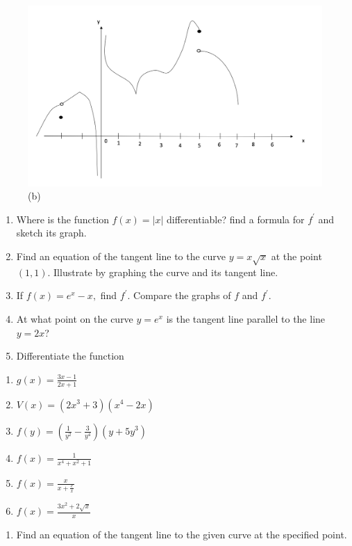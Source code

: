 \documentclass[]{book}
\providecommand{\tightlist}{%
  \setlength{\itemsep}{0pt}\setlength{\parskip}{0pt}}
\begin{document}
\begin{figure}

{\centering \includegraphics[width=0.7\linewidth]{figure/5Derivatives-10} 

}

\caption{(b)}\label{fig:p2}
\end{figure}

\begin{enumerate}
\def\labelenumi{\arabic{enumi}.}
\setcounter{enumi}{3}
\item
  Where is the function \(f(x) = |x|\) differentiable? find a formula for \(f^\prime\) and sketch its graph.
\item
  Find an equation of the tangent line to the curve \(y=x \sqrt x\) at the point \((1,1).\) Illustrate by graphing the curve and its tangent line.
\item
  If \(f(x) = e^x -x,\) find \(f^\prime\). Compare the graphs of \(f\) and \(f^\prime\).
\item
  At what point on the curve \(y=e^x\) is the tangent line parallel to the line \(y=2x\)?
\item
  Differentiate the function
\end{enumerate}

\begin{enumerate}
\def\labelenumi{(\alph{enumi})}
\tightlist
\item
  \(g(x) = \frac{3x-1}{2x+1}\)
\item
  \(V(x) = (2x^3+3)(x^4-2x)\)
\item
  \(f(y) = \left ( \frac{1}{y^2}- \frac{3}{y^4} \right ) (y+5y^3)\)
\item
  \(f(x) = \frac{1}{x^4+x^2+1}\)
\item
  \(f(x) = \frac{x}{x+\frac{c}{x}}\)
\item
  \(f(x) = \frac{3x^2+2\sqrt x}{x}\)
\end{enumerate}

\begin{enumerate}
\def\labelenumi{\arabic{enumi}.}
\setcounter{enumi}{8}
\tightlist
\item
  Find an equation of the tangent line to the given curve at the specified point.
\end{enumerate}
\end{document}

